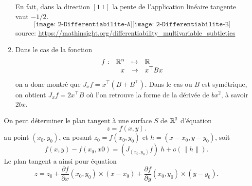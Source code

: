 \begin{enumerate}
{  En fait, dans la direction $[1 \; 1]$ la pente de l'application linéaire tangente vaut $-1/2$.
  $$
  \texttt{[image: 2-Differentiabilite-A]}
  \texttt{[image: 2-Differentiabilite-B]}
  $$
  source: \url{https://mathinsight.org/differentiability_multivariable_subtleties}
  }
  \item Dans le cas de la fonction
  $$
  \begin{array}{rrcl}
    f : & \mathbb{R}^n & \mapsto & \mathbb{R} \\
    & x & \to & x^\top B x
  \end{array}
  $$
  on a donc montré que $J_x f = x^\top (B + B^\top)$. Dans le cas ou $B$ est symétrique, on obtient $J_x f = 2 x^\top B$ où l'on retrouve la forme de la dérivée de $bx^2$, à savoir $2 bx$.

\end{enumerate}

\remark
On peut déterminer le plan tangent à une surface $S$ de $\mathbb{R}^3$ d'équation
$$
z = f(x, y).
$$
au point $(x_0, y_0)$, en posant $z_0 = f(x_0, y_0)$ et $h = (x-x_0, y-y_0)$, soit 
$$
f(x, y) - f(x_0, x0) = \left(J_{(x_0, y_0)} f\right) \; h + o(\|h\|).
$$
Le plan tangent a ainsi pour équation
$$
z = z_0 + \frac{\partial f}{\partial x}(x_0, y_0) \times (x-x_0) + \frac{\partial f}{\partial y}(x_0, y_0) \times (y-y_0).
$$



